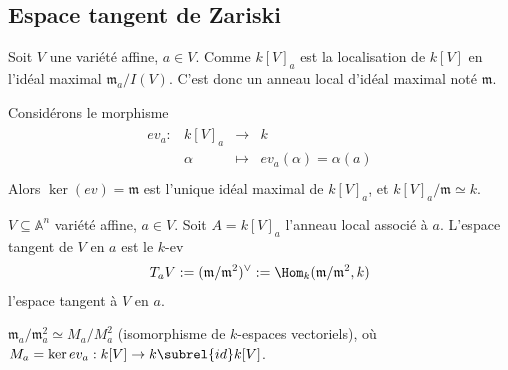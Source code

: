        \subsection{Espace tangent de Zariski}
            Soit $V$ une variété affine, $a \in V$. Comme $k[V]_a$ est la localisation de $k[V]$ en l'idéal maximal $\mathfrak{m}_a/I(V)$. C'est donc un anneau local d'idéal maximal noté 
            $\mathfrak{m}$.
            \begin{exo}
                Considérons le morphisme
                \begin{align*}
                    \begin{array}{cccc}
                        ev_a : & k[V]_a & \to & k \\
                        & \alpha & \mapsto & ev_a(\alpha) = \alpha(a) \\
                    \end{array}
                \end{align*}
                Alors $\ker(ev) = \mathfrak{m}$ est l'unique idéal maximal de $k[V]_a$, et $k[V]_a/\mathfrak{m} \simeq k$. 
            \end{exo}
            \begin{defi}
                $V \subseteq \mathbb{A}^n$ variété affine, $a \in V$. Soit $A = k[V]_a$ l'anneau local associé à $a$. L'espace tangent de $V$ en $a$ est le $k$-ev
                \begin{align*}
                    T_aV := (\mathfrak{m}/ \mathfrak{m}^2)^{\vee} := \Hom_k(\mathfrak{m}/ \mathfrak{m}^2, k)
                \end{align*}
                l'espace tangent à $V$ en $a$.
            \end{defi}
            \begin{remq}
                $\mathfrak{m}_a/\mathfrak{m}_a^2 \simeq M_a/M_a^2$ (isomorphisme de $k$-espaces vectoriels), où $M_a = \ker ev_a : k[V] \to k \subrel{id} k[V]$. 
            \end{remq}
